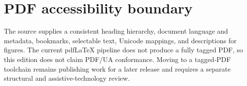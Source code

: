 \section*{PDF accessibility boundary}

The source supplies a consistent heading hierarchy, document language and metadata, bookmarks,
selectable text, Unicode mappings, and descriptions for figures. The current pdfLaTeX pipeline
does not produce a fully tagged PDF, so this edition does not claim PDF/UA conformance. Moving to
a tagged-PDF toolchain remains publishing work for a later release and requires a separate
structural and assistive-technology review.
